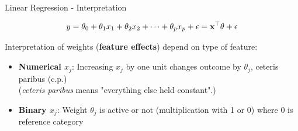 \documentclass[11pt,compress,t,notes=noshow, aspectratio=169, xcolor=table]{beamer}
\begin{document}

\begin{frame}[c]{Linear Regression - Interpretation}

$$y = \theta_0 + \theta_1 x_1 + \theta_2 x_2 + \dots + \theta_p x_p + \epsilon = \xv^\top \theta + \epsilon$$

    Interpretation of weights (\textbf{feature effects}) depend on type of feature:
    \begin{itemize}[<+->]
        \item \textbf{Numerical $x_j$}: Increasing $x_j$ by one unit changes outcome by $\theta_j$, ceteris paribus (c.p.) \\ (\textit{ceteris paribus} means "everything else held constant".)
        \item \textbf{Binary $x_j$}: Weight $\theta_j$ is active or not (multiplication with 1 or 0) where 0 is reference category
    \end{itemize}


\end{frame}
\end{document}
